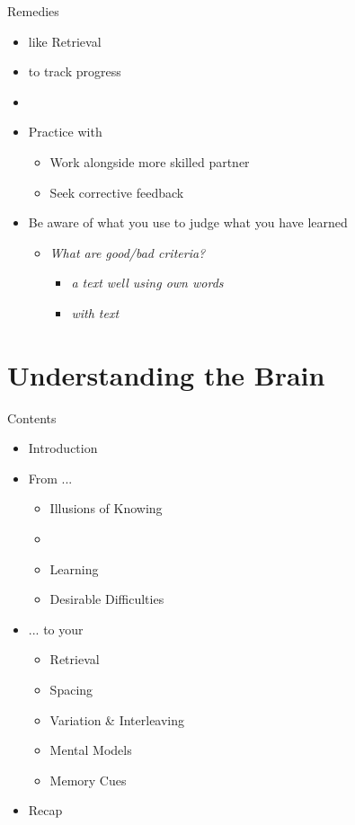 \documentclass{ercisbeamer}
\begin{document}
\begin{frame}{Remedies}
    \begin{itemize}
        \item {} like Retrieval
        \item {} to track progress
        \item {}
        \item Practice with 
        \begin{itemize}
            \item Work alongside more skilled partner
            \item Seek corrective feedback
        \end{itemize}
        \item Be aware of what  you use to judge what you have learned
        \begin{itemize}
            \item \emph{What are good/bad criteria?} \pause
            \begin{itemize}
                \item \emph{ a text well using own words}
                \item \emph{ with text}
            \end{itemize}
        \end{itemize}
    \end{itemize}
\end{frame}

\section{Understanding the Brain}
\begin{frame}{Contents}
    \begin{itemize}
        \item Introduction
        \item From ...
        \begin{itemize}
            \item Illusions of Knowing
            \item {}
            \item Learning
            \item Desirable Difficulties
        \end{itemize}
        \item ... to your 
        \begin{itemize}
            \item Retrieval
            \item Spacing
            \item Variation \& Interleaving
            \item Mental Models
            \item Memory Cues
        \end{itemize}
        \item Recap
    \end{itemize}
\end{frame}
\end{document}
